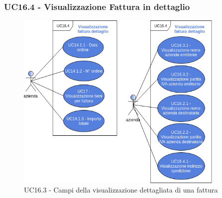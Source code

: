 \subsubsection{UC16.4 - Visualizzazione Fattura in dettaglio}
\begin{figure}[h]
	\includegraphics[width=10cm]{res/images/UC16-VisualizzazioneFatturaDettaglio.png}
	\centering
	\caption{UC16.3 - Campi della visualizzazione dettagliata di una fattura}
\end{figure}
